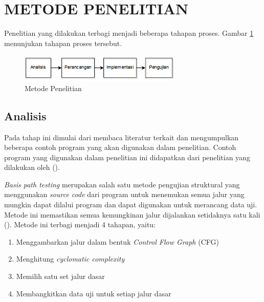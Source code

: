 \section*{METODE PENELITIAN}

Penelitian yang dilakukan terbagi menjadi beberapa tahapan proses. Gambar \ref{fig:metodepenelitian} menunjukan tahapan proses tersebut.

\begin{figure}[h!]
	\centering
	\includegraphics[width=220pt]{gambar/metode_penelitian}
	\caption{Metode Penelitian}
	\label{fig:metodepenelitian}
\end{figure}

\subsection*{Analisis}

Pada tahap ini dimulai dari membaca literatur terkait dan mengumpulkan beberapa contoh program yang akan digunakan dalam penelitian. Contoh program yang digunakan dalam penelitian ini didapatkan dari penelitian yang dilakukan oleh \citeauthor{HERMADI2015} (\cite*{HERMADI2015}).  

\textit{Basis path testing} merupakan salah satu metode pengujian struktural yang menggunakan \textit{source code} dari program untuk menemukan semua jalur yang mungkin dapat dilalui program dan dapat digunakan untuk merancang data uji. Metode ini memastikan semua kemungkinan jalur dijalankan setidaknya satu kali (\cite{BASU2015}). Metode ini terbagi menjadi 4 tahapan, yaitu:
\begin{enumerate}[noitemsep] 
	\item Menggambarkan jalur dalam bentuk \textit{ Control Flow Graph} (CFG)
	\item Menghitung \textit{cyclomatic complexity}
	\item Memilih satu set jalur dasar
	\item Membangkitkan data uji untuk setiap jalur dasar
\end{enumerate}

